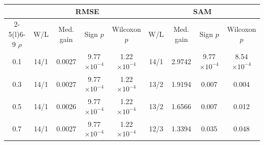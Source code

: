 \begin{tabular}{@{}c*{4}{c}*{4}{c}@{}}
\toprule
 & \multicolumn{4}{c}{RMSE} & \multicolumn{4}{c}{SAM} \\
\cmidrule(lr){2-5}\cmidrule(l){6-9}
$\rho$ & W/L & Med. gain & Sign $p$ & Wilcoxon $p$ & W/L & Med. gain & Sign $p$ & Wilcoxon $p$ \\
\midrule
0.1 & 14/1 & 0.0027 & 9.77$\times 10^{-4}$ & 1.22$\times 10^{-4}$ & 14/1 & 2.9742 & 9.77$\times 10^{-4}$ & 8.54$\times 10^{-4}$ \\
0.3 & 14/1 & 0.0027 & 9.77$\times 10^{-4}$ & 1.22$\times 10^{-4}$ & 13/2 & 1.9194 & 0.007 & 0.004 \\
0.5 & 14/1 & 0.0026 & 9.77$\times 10^{-4}$ & 1.22$\times 10^{-4}$ & 13/2 & 1.6566 & 0.007 & 0.012 \\
0.7 & 14/1 & 0.0027 & 9.77$\times 10^{-4}$ & 1.22$\times 10^{-4}$ & 12/3 & 1.3394 & 0.035 & 0.048 \\
\bottomrule
\end{tabular}
